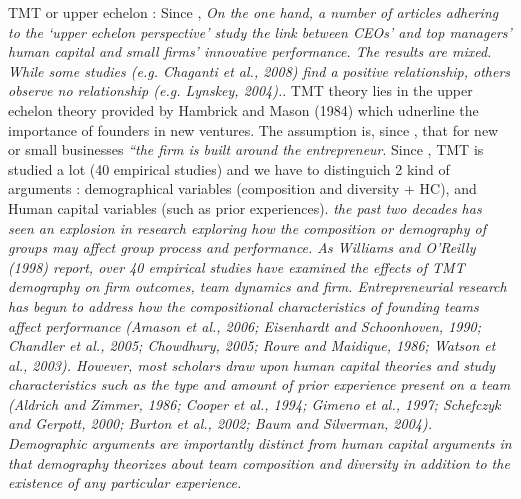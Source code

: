 TMT or upper echelon : Since \citet{andries2014small}, \textit{On the one hand, a number of articles adhering to the ‘upper echelon perspective’ study the link between CEOs’ and top managers’ human capital and small firms’ innovative performance. The results are mixed. While some studies (e.g. Chaganti et al., 2008) find a positive relationship, others observe no relationship (e.g. Lynskey, 2004).}. TMT theory lies in the upper echelon theory provided by Hambrick and Mason (1984) which udnerline the importance of founders in new ventures. The assumption is, since \citep{cooper1994initial}, that for new or small businesses \textit{“the firm is built around the entrepreneur}. Since \citet{beckman2007early}, TMT is studied a lot (40 empirical studies) and we have to distinguich 2 kind of arguments : demographical variables (composition and diversity + HC), and Human capital variables (such as prior experiences). \textit{the past two decades has seen an explosion in research exploring how the composition or demography of groups may affect group process and performance. As Williams and O’Reilly (1998) report, over 40 empirical studies have examined the effects of TMT demography on firm outcomes, team dynamics and firm. Entrepreneurial research has begun to address how the compositional characteristics of founding teams affect performance (Amason et al., 2006; Eisenhardt and Schoonhoven, 1990; Chandler et al., 2005; Chowdhury, 2005; Roure and Maidique, 1986; Watson et al., 2003). However, most scholars draw upon human capital theories and study characteristics such as the type and amount of prior experience present on a team (Aldrich and Zimmer, 1986; Cooper et al., 1994; Gimeno et al., 1997; Schefczyk and Gerpott, 2000; Burton et al., 2002; Baum and Silverman, 2004). Demographic arguments are importantly distinct from human capital arguments in that demography theorizes about team composition and diversity in addition to the existence of any particular experience.}\\

